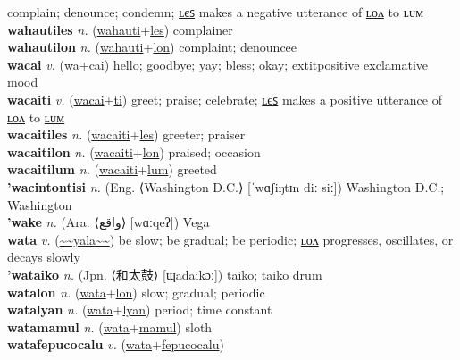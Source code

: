 complain; denounce; condemn; \hyperref[wahautiles]{ʟєꜱ} makes a negative utterance of \hyperref[wahautilon]{ʟᴏᴧ} to ʟᴜᴍ \label{wahauti} \\
\textbf{wahautiles} \textit{n.} (\hyperref[wahauti]{wahauti}+\hyperref[les]{les})
complainer \label{wahautiles} \\
\textbf{wahautilon} \textit{n.} (\hyperref[wahauti]{wahauti}+\hyperref[lon]{lon})
complaint; denouncee \label{wahautilon} \\
\textbf{wacai} \textit{v.} (\hyperref[wa]{wa}+\hyperref[cai]{cai})
hello; goodbye; yay; bless; okay; 	extit{positive exclamative mood} \label{wacai} \\
\textbf{wacaiti} \textit{v.} (\hyperref[wacai]{wacai}+\hyperref[ti]{ti})
greet; praise; celebrate; \hyperref[wacaitiles]{ʟєꜱ} makes a positive utterance of \hyperref[wacaitilon]{ʟᴏᴧ} to \hyperref[wacaitilum]{ʟᴜᴍ} \label{wacaiti} \\
\textbf{wacaitiles} \textit{n.} (\hyperref[wacaiti]{wacaiti}+\hyperref[les]{les})
greeter; praiser \label{wacaitiles} \\
\textbf{wacaitilon} \textit{n.} (\hyperref[wacaiti]{wacaiti}+\hyperref[lon]{lon})
praised; occasion \label{wacaitilon} \\
\textbf{wacaitilum} \textit{n.} (\hyperref[wacaiti]{wacaiti}+\hyperref[lum]{lum})
greeted \label{wacaitilum} \\
\textbf{'wacintontisi} \textit{n.} (Eng. ⟨Washington D.C.⟩ [ˈwɑʃiŋtɪn diː siː])
Washington D.C.; Washington \label{'wacintontisi} \\
\textbf{'wake} \textit{n.} (Ara. ⟨واقع‎⟩ [wɑːqeʔ])
Vega \label{'wake} \\
\textbf{wata} \textit{v.} (\hyperref[yala]{\~{}\~{}yala\~{}\~{}})
be slow; be gradual; be periodic; \hyperref[watalon]{ʟᴏᴧ} progresses, oscillates, or decays slowly \label{wata} \\
\textbf{'wataiko} \textit{n.} (Jpn. ⟨和太鼓⟩ [ɰadaikɔː])
taiko; taiko drum \label{'wataiko} \\
\textbf{watalon} \textit{n.} (\hyperref[wata]{wata}+\hyperref[lon]{lon})
slow; gradual; periodic \label{watalon} \\
\textbf{watalyan} \textit{n.} (\hyperref[wata]{wata}+\hyperref[lyan]{lyan})
period; time constant \label{watalyan} \\
\textbf{watamamul} \textit{n.} (\hyperref[wata]{wata}+\hyperref[mamul]{mamul})
sloth \label{watamamul} \\
\textbf{watafepucocalu} \textit{v.} (\hyperref[wata]{wata}+\hyperref[fepucocalu]{fepucocalu})
